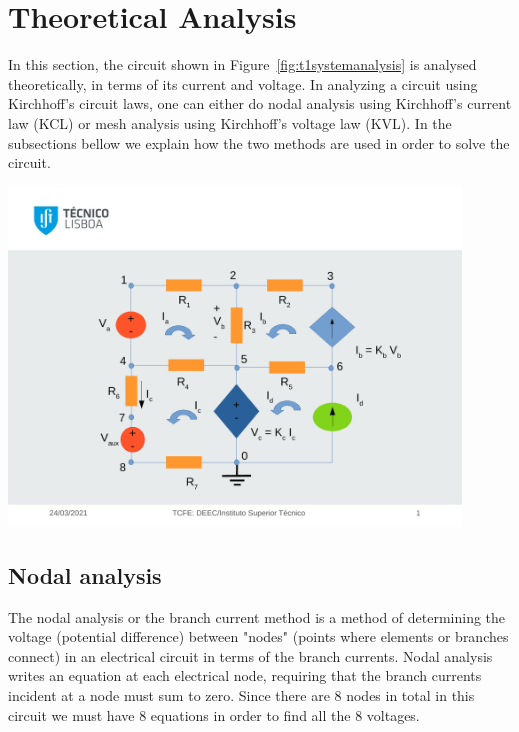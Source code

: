 \section{Theoretical Analysis}
\label{sec:analysis}

In this section, the circuit shown in Figure~\ref{fig:t1systemanalysis} is analysed
theoretically, in terms of its current and voltage.
In analyzing a circuit using Kirchhoff's circuit laws, one can either do nodal analysis using Kirchhoff's current law (KCL) or mesh analysis using Kirchhoff's voltage law (KVL).
In the subsections bellow we explain how the two methods are used in order to solve the circuit. 


\begin{center}

\includegraphics[width  = 12cm]{t1systemanalysis.pdf}

\end{center}




\subsection{Nodal analysis}
The nodal analysis or the branch current method is a method of determining the voltage (potential difference) between "nodes" (points where elements or branches connect) in an electrical circuit in terms of the branch currents. 
Nodal analysis writes an equation at each electrical node, requiring that the branch currents incident at a node must sum to zero.
Since there are 8 nodes in total in this circuit we must have 8 equations in order to find all the 8 voltages.


